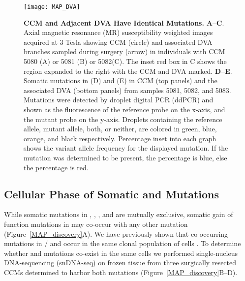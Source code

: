 \begin{figure}[!ht]
\centering
\texttt{[image: MAP\_DVA]}
\caption[CCM and Adjacent DVA Have Identical  Mutations]{\textbf{CCM and Adjacent DVA Have Identical  Mutations.}
\textbf{A--C}. Axial magnetic resonance (MR) susceptibility weighted images acquired at 3 Tesla showing CCM (circle) and associated DVA branches sampled during surgery (arrow) in individuals with CCM 5080 (A) or 5081 (B) or 5082(C). The inset red box in C shows the region expanded to the right with the CCM and DVA marked. \textbf{D--E}. Somatic mutations in  (D) and  (E) in CCM (top panels) and the associated DVA (bottom panels) from samples 5081, 5082, and 5083. Mutations were detected by droplet digital PCR (ddPCR) and shown as the fluorescence of the reference probe on the x-axis, and the mutant probe on the y-axis. Droplets containing the reference allele, mutant allele, both, or neither, are colored in green, blue, orange, and black respectively. Percentage inset into each graph shows the variant allele frequency for the displayed mutation. If the mutation was determined to be present, the percentage is blue, else the percentage is red.}

\label{MAP_DVA}
\end{figure}

\subsection{Cellular Phase of Somatic  and  Mutations}

While somatic mutations in , , , and  are mutually exclusive, somatic gain of function mutations in  may co-occur with any other mutation (Figure~\ref{MAP_discovery}A). We have previously shown that co-occurring mutations in / and  occur in the same clonal population of cells \citep{ren2021}. To determine whether  and  mutations co-exist in the same cells we performed single-nucleus DNA-sequencing (snDNA-seq) on frozen tissue from three surgically resected CCMs determined to harbor both mutations (Figure~\ref{MAP_discovery}B--D). 

